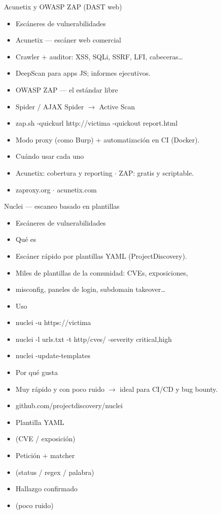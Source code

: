 \documentclass[aspectratio=169,10pt]{beamer}
\begin{document}
\begin{frame}[allowframebreaks]{Acunetix y OWASP ZAP (DAST web)}
\small
  \begin{itemize}
  \item Escáneres de vulnerabilidades
  \item Acunetix --- escáner web comercial
  \item Crawler + auditor: XSS, SQLi, SSRF, LFI, cabeceras\dots{}
  \item DeepScan para apps JS; informes ejecutivos.
  \item OWASP ZAP --- el estándar libre
  \item Spider / AJAX Spider $\rightarrow$ Active Scan
  \item zap.sh -quickurl http://victima -quickout report.html
  \item Modo proxy (como Burp) + automatización en CI (Docker).
  \item Cuándo usar cada uno
  \item Acunetix: cobertura y reporting $\cdot$ ZAP: gratis y scriptable.
  \item zaproxy.org $\cdot$ acunetix.com
  \end{itemize}
\end{frame}

\begin{frame}[allowframebreaks]{Nuclei --- escaneo basado en plantillas}
\small
  \begin{itemize}
  \item Escáneres de vulnerabilidades
  \item Qué es
  \item Escáner rápido por plantillas YAML (ProjectDiscovery).
  \item Miles de plantillas de la comunidad: CVEs, exposiciones,
  \item misconfig, paneles de login, subdomain takeover\dots{}
  \item Uso
  \item nuclei -u https://victima
  \item nuclei -l urls.txt -t http/cves/ -severity critical,high
  \item nuclei -update-templates
  \item Por qué gusta
  \item Muy rápido y con poco ruido $\rightarrow$ ideal para CI/CD y bug bounty.
  \item github.com/projectdiscovery/nuclei
  \item Plantilla YAML
  \item (CVE / exposición)
  \item Petición + matcher
  \item (status / regex / palabra)
  \item Hallazgo confirmado
  \item (poco ruido)
  \end{itemize}
\end{frame}
\end{document}

